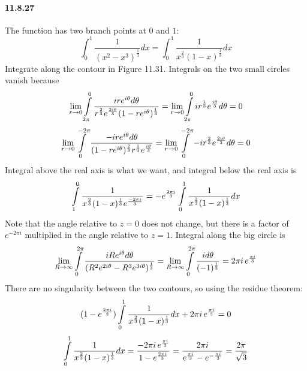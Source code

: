 \documentclass[a4paper]{article}
\begin{document}
\paragraph{11.8.27}
The function has two branch points at $0$ and $1$:
\[
\int_0^1\frac{1}{(x^2-x^3)^{\frac{1}{3}}}dx=\int_0^1\frac{1}{x^{\frac{2}{3}}(1-x)^{\frac{1}{3}}}dx
\]
Integrate along the contour in Figure 11.31. Integrals on the two small circles vanish because
\[
\lim_{r\to0}\int\displaylimits_{2\pi}^0\frac{ire^{i\theta}d\theta}{r^{\frac{2}{3}}e^{\frac{2i\theta}{3}}(1-re^{i\theta})^\frac{1}{3}}=\lim_{r\to0}\int\displaylimits_{2\pi}^0ir^{\frac{1}{3}}e^{\frac{i\theta}{3}}d\theta=0
\]
\[
\lim_{r\to0}\int\displaylimits_0^{-2\pi}\frac{-ire^{i\theta}d\theta}{(1-re^{i\theta})^{\frac{2}{3}}r^{\frac{1}{3}}e^{\frac{i\theta}{3}}}=\lim_{r\to0}\int\displaylimits_0^{-2\pi}-ir^{\frac{2}{3}}e^{\frac{2i\theta}{3}}d\theta=0
\]
Integral above the real axis is what we want, and integral below the real axis is
\[
\int\displaylimits_1^0\frac{1}{x^{\frac{2}{3}}(1-x)^{\frac{1}{3}}e^{\frac{-2\pi i}{3}}}=-e^{\frac{2\pi i}{3}}\int\displaylimits_0^1\frac{1}{x^{\frac{2}{3}}(1-x)^{\frac{1}{3}}}dx
\]
Note that the angle relative to $z=0$ does not change, but there is a factor of $e^{-2\pi i}$ multiplied in the angle relative to $z=1$. 
Integral along the big circle is
\[
\lim_{R\to\infty}\int\displaylimits_0^{2\pi}\frac{iRe^{i\theta}d\theta}{(R^2e^{2i\theta}-R^3e^{3i\theta})^{\frac{1}{3}}}=\lim_{R\to\infty}\int\displaylimits_0^{2\pi}\frac{id\theta}{(-1)^{\frac{1}{3}}}=2\pi i\,e^{\frac{\pi i}{3}}
\]
There are no singularity between the two contours, so using the residue theorem:
\[
(1-e^{\frac{2\pi i}{3}})\int\displaylimits_0^1\frac{1}{x^{\frac{2}{3}}(1-x)^{\frac{1}{3}}}dx+2\pi i\,e^{\frac{\pi i}{3}}=0
\]
\[
\int\displaylimits_0^1\frac{1}{x^{\frac{2}{3}}(1-x)^{\frac{1}{3}}}dx=\frac{-2\pi i\,e^{\frac{\pi i}{3}}}{1-e^{\frac{2\pi i}{3}}}=\frac{2\pi i}{e^{\frac{\pi i}{3}}-e^{-\frac{\pi i}{3}}}=\frac{2\pi}{\sqrt{3}}
\]
\end{document}
